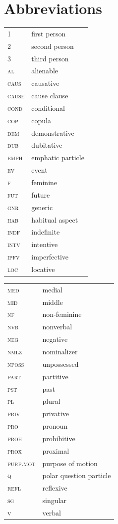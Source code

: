 \documentclass[output=paper,colorlinks,citecolor=brown]{langscibook}
\begin{document}
\section*{Abbreviations}
\begin{tabularx}{.45\textwidth}{lQ}
\scshape 1 & first person \\
\scshape 2 & second person \\
\scshape 3 & third person \\
\scshape al & alienable \\
\scshape caus & causative \\
\scshape cause & cause clause \\
\scshape cond & conditional  \\
\scshape cop 	& copula \\ 
\scshape dem 	& demonstrative \\ 
\scshape dub 	& dubitative \\ 
\scshape emph & emphatic particle  \\
\scshape ev 	& event \\ 
\scshape f 	& feminine \\	
\scshape fut & future \\
\scshape gnr	& generic \\
\scshape hab & habitual aspect  \\
\scshape indf 	& indefinite \\
\scshape intv & intentive \\
\scshape ipfv 	& imperfective \\
\scshape loc & locative  \\
\end{tabularx}
\begin{tabularx}{.45\textwidth}{lQ}
\scshape med	& medial \\			
\scshape mid	& middle \\
\scshape nf 	& non-feminine	\\
\scshape nvb & nonverbal \\   
\scshape neg & negative  \\
\scshape nmlz & nominalizer \\
\scshape nposs 	& unpossessed \\
\scshape part & partitive \\  
\scshape pst & past \\
\scshape pl & plural  \\
\scshape priv 	& privative \\ 				
\scshape pro 	& pronoun \\		
\scshape proh 	& prohibitive \\	
\scshape prox 	& proximal \\ 
\scshape purp.mot & 	purpose of motion \\ 
\scshape q & polar question particle  \\
\scshape refl & reflexive \\
\scshape sg & singular  \\
\scshape v 	& verbal \\ 

\end{tabularx}


\sloppy\printbibliography[heading=subbibliography,notkeyword=this]
\end{document}

